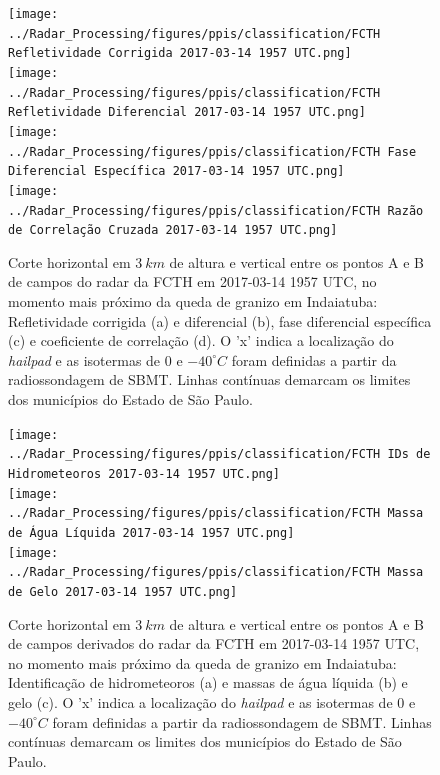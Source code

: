 \begin{figure}[hp]
	\centering
	\caption{Corte horizontal em $3\:km$ de altura e vertical entre os pontos A e B de campos do radar da FCTH em 2017-03-14 1957 UTC, no momento mais próximo da queda de granizo em Indaiatuba: Refletividade corrigida (a) e diferencial (b), fase diferencial específica (c) e coeficiente de correlação (d). O 'x' indica a localização do \textit{hailpad} e as isotermas de $0$ e $-40^{\circ}C$ foram definidas a partir da radiossondagem de SBMT. Linhas contínuas demarcam os limites dos municípios do Estado de São Paulo.}
	\label{radar_20170314_2}
	\vspace{-5pt}
	\texttt{[image: ../Radar\_Processing/figures/ppis/classification/FCTH Refletividade Corrigida 2017-03-14 1957 UTC.png]} \\
	\vspace{-5pt}
	\texttt{[image: ../Radar\_Processing/figures/ppis/classification/FCTH Refletividade Diferencial 2017-03-14 1957 UTC.png]} \\
	\vspace{-5pt}
	\texttt{[image: ../Radar\_Processing/figures/ppis/classification/FCTH Fase Diferencial Específica 2017-03-14 1957 UTC.png]} \\
	\vspace{-5pt}
	\texttt{[image: ../Radar\_Processing/figures/ppis/classification/FCTH Razão de Correlação Cruzada 2017-03-14 1957 UTC.png]} \\
\end{figure}

\begin{figure}[htb]
	\centering
	\caption{Corte horizontal em $3\:km$ de altura e vertical entre os pontos A e B de campos derivados do radar da FCTH em 2017-03-14 1957 UTC, no momento mais próximo da queda de granizo em Indaiatuba: Identificação de hidrometeoros (a) e massas de água líquida (b) e gelo (c). O 'x' indica a localização do \textit{hailpad} e as isotermas de $0$ e $-40^{\circ}C$ foram definidas a partir da radiossondagem de SBMT. Linhas contínuas demarcam os limites dos municípios do Estado de São Paulo.} 
	\label{radar_derived_20170314_2}
	\vspace{-5pt}
	\texttt{[image: ../Radar\_Processing/figures/ppis/classification/FCTH IDs de Hidrometeoros 2017-03-14 1957 UTC.png]} \\
	\vspace{-5pt}
	\texttt{[image: ../Radar\_Processing/figures/ppis/classification/FCTH Massa de Água Líquida 2017-03-14 1957 UTC.png]} \\
	\vspace{-5pt}
	\texttt{[image: ../Radar\_Processing/figures/ppis/classification/FCTH Massa de Gelo 2017-03-14 1957 UTC.png]} \\
\end{figure}

